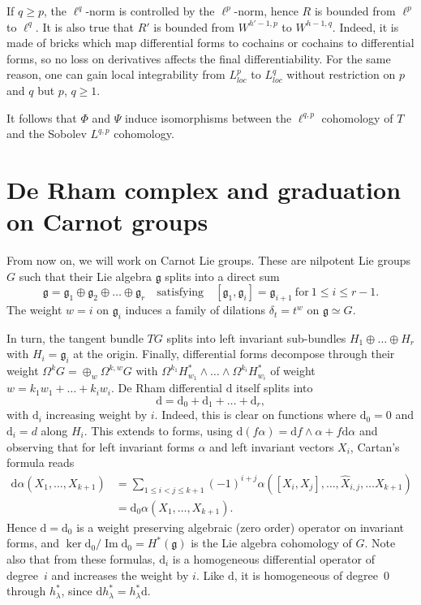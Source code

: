 \documentclass[11pt]{article}
\theoremstyle{definition}
\numberwithin{equation}{section}
\numberwithin{figure}{section}
\numberwithin{table}{section}
\DeclareMathOperator{\im}{Im}
\newcommand{\dd}{\mathrm{d}}
\newcommand{\dalpha}{\dd \alpha}
\begin{document}
If $q\geq p$, the $\ell^q$-norm is controlled by the $\ell^p$-norm, hence $R$ is bounded from $\ell^p$ to $\ell^q$. It is also true that $R'$ is bounded from $W^{h'-1,p}$ to $W^{h-1,q}$. Indeed, it is made of bricks which map differential forms to cochains or cochains to differential forms, so no loss on derivatives affects the final differentiability. For the same reason, one can gain local integrability from $L^p_{loc}$ to $L^q_{loc}$ without restriction on $p$ and $q$ but $p$, $q\geq 1$.

It follows that $\Phi$ and $\Psi$ induce isomorphisms between the $\ell^{q,p}$ cohomology of $T$ and the Sobolev $L^{q,p}$ cohomology.


\section{De Rham complex and graduation on Carnot groups}\label{sec:dc_complex}

From now on, we will work on Carnot Lie groups. These are nilpotent Lie groups $G$ such that their Lie algebra $\mathfrak{g}$ splits into a direct sum
\[
\mathfrak{g} = \mathfrak{g}_1 \oplus \mathfrak{g}_2 \oplus \dots
\oplus\mathfrak{g}_r \quad \mathrm{satisfying} \quad [\mathfrak{g}_1,
\mathfrak{g}_i] = \mathfrak{g}_{i+1} \ \mathrm{for} \ 1\leq i \leq r-1.
\]
The weight $w = i$ on $\mathfrak{g}_i$ induces a family of dilations $\delta_t = t^w$ on $\mathfrak{g} \simeq G$.

In turn, the tangent bundle $TG$ splits into left invariant sub-bundles $H_1 \oplus \dots \oplus H_r$ with $H_i = \mathfrak{g}_i$ at the origin. Finally, differential forms decompose through their weight $\Omega^k G = \oplus_w \Omega^{k,w} G$ with $\Omega^{k_1} H^*_{w_1}\wedge \dots \wedge \Omega^{k_i}H^*_{w_i}$ of weight $w = k_1 w_1 + \dots + k_i w_i$. De Rham differential $\dd$ itself splits into
\[
\dd = \dd_0 + \dd_1 + \dots + \dd_r,
\]
with $\dd_i$ increasing weight by $i$. Indeed, this is clear on functions where $\dd_0 = 0$ and $\dd_i = d $ along $H_i$. This extends to forms, using $\dd(f\alpha) = \dd f \wedge \alpha + f \dalpha$ and observing that for left invariant forms $\alpha$ and left invariant vectors $X_i$, Cartan's formula reads
\begin{align*}
\dalpha (X_1,\dots, X_{k+1}) & = \sum_{1\leq i < j\leq k+1} (-1)^{i+j}
\alpha ([X_i,X_j], \dots, \widehat{X}_{i,j},
\dots X_{k+1}) \\
& = \dd_0 \alpha (X_1,\dots, X_{k+1}).
\end{align*}
Hence $\dd= \dd_0$ is a weight preserving algebraic (zero order) operator on invariant forms, and $\ker \dd_0 / \im \dd_0 = H^*(\mathfrak{g})$ is the Lie algebra cohomology of $G$. Note also that from these formulas, $\dd_i$ is a homogeneous differential operator of degree~$i$ and increases the weight by $i$. Like $\dd$, it is homogeneous of degree~$0$ through $h^*_\lambda$, since $\dd h^*_\lambda = h^*_\lambda \dd$.
\end{document}
